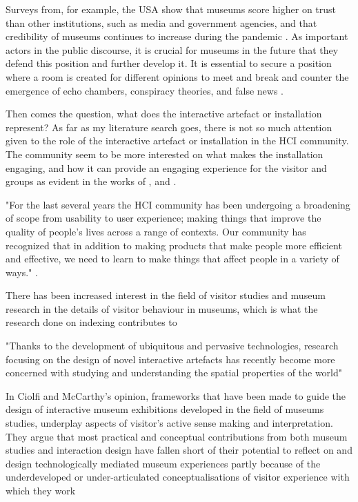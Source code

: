 Surveys from, for example, the USA show that museums score higher on trust than other institutions, such as media and government agencies, and that credibility of museums continues to increase during the pandemic \autocite{impact_2020}. As important actors in the public discourse, it is crucial for museums in the future that they defend this position and further develop it. It is essential to secure a position where a room is created for different opinions to meet and break and counter the emergence of echo chambers, conspiracy theories, and false news \autocite[p. 41]{melding23}.


Then comes the question, what does the interactive artefact or installation represent? As far as my literature search goes, there is not so much attention given to the role of the interactive artefact or installation in the HCI community. The community seem to be more interested on what makes the installation engaging, and how it can provide an engaging experience for the visitor and groups as evident in the works of \autocite{hornecker_learning_2006}, and \autocite{ciolfi_designing_2012}.

"For the last several years the HCI community has been undergoing a broadening of scope from usability to user experience; making things that improve the quality of people’s lives across a range of contexts. Our community has recognized that in addition to making products that make people more efficient and effective, we need to learn to make things that affect people in a variety of ways." \autocite[p. 395]{zimmerman_designing_2009}. 

There has been increased interest in the field of visitor studies and museum research in the details of visitor behaviour in museums, which is what the research done on indexing contributes to \autocite[p. 41]{hornecker_to-and-fro_2016}


"Thanks to the development of ubiquitous and pervasive technologies, research focusing on the design of novel interactive artefacts has recently become more concerned with studying and understanding the spatial properties of the world" \autocite[p. 159]{hybridplace_ciolfi}

In Ciolfi and McCarthy’s opinion, frameworks that have been made to guide the design of interactive museum exhibitions developed in the field of museums studies, underplay aspects of visitor’s active sense making and interpretation. They argue that most practical and conceptual contributions from both museum studies and interaction design have fallen short of their potential to reflect on and design technologically mediated museum experiences partly because of the underdeveloped or under-articulated conceptualisations of visitor experience with which they work \autocite[p. 248]{mccarthy_place}


